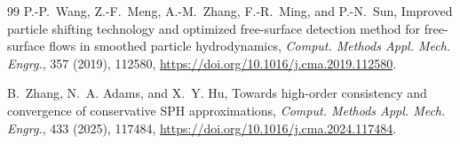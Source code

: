 \documentclass[11pt]{article}
\theoremstyle{plain}
\theoremstyle{definition}
\theoremstyle{remark}
\begin{document}
\begin{thebibliography}{99}
P.-P.~Wang, Z.-F.~Meng, A.-M.~Zhang, F.-R.~Ming, and P.-N.~Sun,
Improved particle shifting technology and optimized free-surface detection
method for free-surface flows in smoothed particle hydrodynamics,
\emph{Comput. Methods Appl. Mech. Engrg.}, 357 (2019), 112580,
\url{https://doi.org/10.1016/j.cma.2019.112580}.

B.~Zhang, N.~A. Adams, and X.~Y. Hu,
Towards high-order consistency and convergence of conservative SPH
approximations,
\emph{Comput. Methods Appl. Mech. Engrg.}, 433 (2025), 117484,
\url{https://doi.org/10.1016/j.cma.2024.117484}.

\end{thebibliography}
\end{document}
